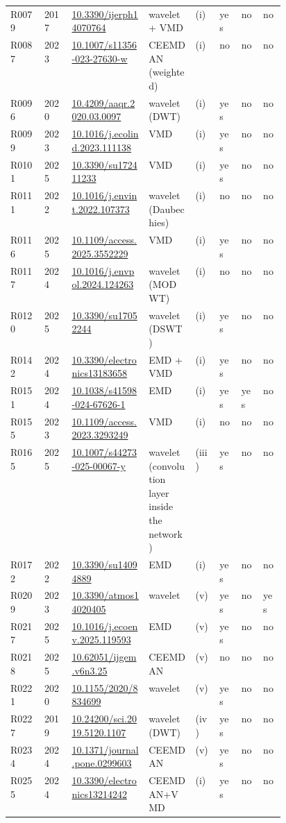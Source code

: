 \begin{longtable}{llp{0.29\linewidth}p{0.17\linewidth}llll}
R0079 & 2017 & \url{10.3390/ijerph14070764} & wavelet + VMD & (i) & yes & no & no \\
R0087 & 2023 & \url{10.1007/s11356-023-27630-w} & CEEMDAN (weighted) & (i) & no & no & no \\
R0096 & 2020 & \url{10.4209/aaqr.2020.03.0097} & wavelet (DWT) & (i) & yes & no & no \\
R0099 & 2023 & \url{10.1016/j.ecolind.2023.111138} & VMD & (i) & yes & no & no \\
R0101 & 2025 & \url{10.3390/su172411233} & VMD & (i) & yes & no & no \\
R0111 & 2022 & \url{10.1016/j.envint.2022.107373} & wavelet (Daubechies) & (i) & no & no & no \\
R0116 & 2025 & \url{10.1109/access.2025.3552229} & VMD & (i) & yes & no & no \\
R0117 & 2024 & \url{10.1016/j.envpol.2024.124263} & wavelet (MODWT) & (i) & no & no & no \\
R0120 & 2025 & \url{10.3390/su17052244} & wavelet (DSWT) & (i) & yes & no & no \\
R0142 & 2024 & \url{10.3390/electronics13183658} & EMD + VMD & (i) & yes & no & no \\
R0151 & 2024 & \url{10.1038/s41598-024-67626-1} & EMD & (i) & yes & yes & no \\
R0155 & 2023 & \url{10.1109/access.2023.3293249} & VMD & (i) & no & no & no \\
R0165 & 2025 & \url{10.1007/s44273-025-00067-y} & wavelet (convolution layer inside the network) & (iii) & yes & no & no \\
R0172 & 2022 & \url{10.3390/su14094889} & EMD & (i) & yes & no & no \\
R0209 & 2023 & \url{10.3390/atmos14020405} & wavelet & (v) & yes & no & yes \\
R0217 & 2025 & \url{10.1016/j.ecoenv.2025.119593} & EMD & (v) & yes & no & no \\
R0218 & 2025 & \url{10.62051/ijgem.v6n3.25} & CEEMDAN & (v) & no & no & no \\
R0221 & 2020 & \url{10.1155/2020/8834699} & wavelet & (v) & yes & no & no \\
R0227 & 2019 & \url{10.24200/sci.2019.5120.1107} & wavelet (DWT) & (iv) & yes & no & no \\
R0234 & 2024 & \url{10.1371/journal.pone.0299603} & CEEMDAN & (v) & yes & no & no \\
R0255 & 2024 & \url{10.3390/electronics13214242} & CEEMDAN+VMD & (i) & yes & no & no \\

\end{longtable}

